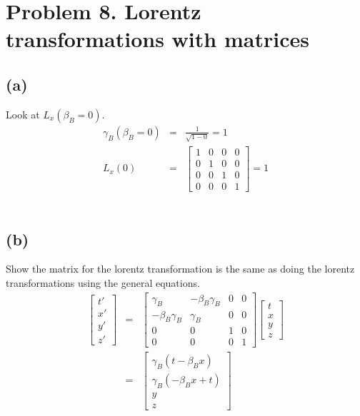 \documentclass[11pt]{amsart}
\begin{document}
\section*{Problem 8. Lorentz transformations with matrices}
\subsection*{(a)} Look at $L_{x}(\beta_{B}=0)$. \\
\begin{eqnarray*}
\gamma_{B}(\beta_{B}=0) &=& \frac{1}{\sqrt{1-0}} = 1 \\
L_{x}(0) &=& \begin{bmatrix}
	1 & 0 & 0 & 0 \\
	0 & 1 & 0 & 0 \\
	0 & 0 & 1 & 0 \\
	0 & 0 & 0 & 1 
	\end{bmatrix}  =1
\end{eqnarray*} \\
\subsection*{(b)} Show the matrix for the lorentz transformation is the same as doing the lorentz transformations using the general equations. \\
\begin{eqnarray*} 
\begin{bmatrix}
	t' \\
	x' \\
	y' \\
	z' 
	\end{bmatrix} &=& \begin{bmatrix}
	\gamma_{B} & -\beta_{B}\gamma_{B} & 0 & 0 \\
	-\beta_{B}\gamma_{B} & \gamma_{B} & 0 & 0 \\
	0 & 0 & 1 & 0 \\
	0 & 0 & 0 & 1 
	\end{bmatrix}\begin{bmatrix}
	t \\
	x \\
	y \\
	z 
	\end{bmatrix} \\
&=& \begin{bmatrix}
	\gamma_{B}(t-\beta_{B}x) \\
	\gamma_{B}(-\beta_{B}x+t) \\
	y \\
	z 
	\end{bmatrix}
\end{eqnarray*} \\
\end{document}
